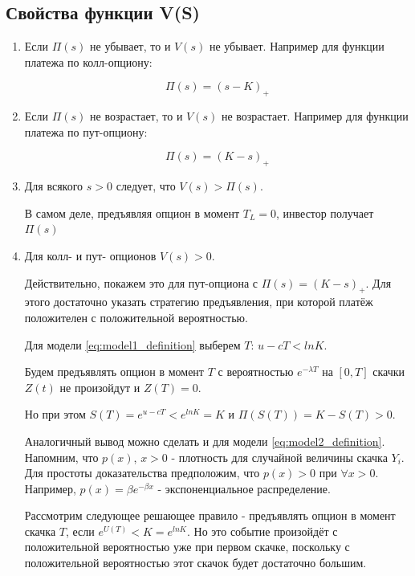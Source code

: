 \documentclass[a4paper,12pt]{article}
\theoremstyle{definition}
\begin{document}
\subsection{Свойства функции V(S)}

\begin{enumerate}
    \item Если $\Pi (s)$ не убывает, то и $V(s)$ не убывает. Например для функции платежа по колл-опциону:
    
    \begin{equation*}
        \Pi (s) = (s - K)_{+}
    \end{equation*}
    
    \item Если $\Pi (s)$ не возрастает, то и $V(s)$ не возрастает. Например для функции платежа по пут-опциону:
    
    \begin{equation*}
        \Pi (s) = (K - s)_{+}
    \end{equation*}
    
    \item Для всякого $s > 0$ следует, что $V(s) > \Pi (s)$.
    
    В самом деле, предъявляя опцион в момент $T_L = 0$, инвестор получает $\Pi (s)$
    
    \item Для колл- и пут- опционов $V(s) > 0$.
    
    Действительно, покажем это для пут-опциона с $\Pi (s) = (K - s)_{+}$. Для этого достаточно указать стратегию предъявления, при которой платёж положителен с положительной вероятностью.
    
    Для модели \eqref{eq:model1_definition} выберем $T$: $u - c T < ln K$.
    
    Будем предъявлять опцион в момент $T$ с вероятностью $e^{-\lambda T}$ на $[0, T]$ скачки $Z(t)$ не произойдут и $Z(T) = 0$. 
    
    Но при этом $S(T) = e^{u - c T} < e^{ln K} = K$ и $\Pi (S(T)) = K - S(T) > 0$.
    
    Аналогичный вывод можно сделать и для модели \eqref{eq:model2_definition}. Напомним, что $p(x)$, $x > 0$ - плотность для случайной величины скачка $Y_i$. Для простоты доказательства предположим, что $p (x) > 0$ при $\forall x > 0$. Например, $p(x) = \beta e^{-\beta x}$ - экспоненциальное распределение.
    
    Рассмотрим следующее решающее правило - предъявлять опцион в момент скачка $T$, если $e^{U(T)} < K = e^{ln K}$. Но это событие произойдёт с положительной вероятностью уже при первом скачке, поскольку с положительной вероятностью этот скачок будет достаточно большим.
    

\end{enumerate}
\end{document}
